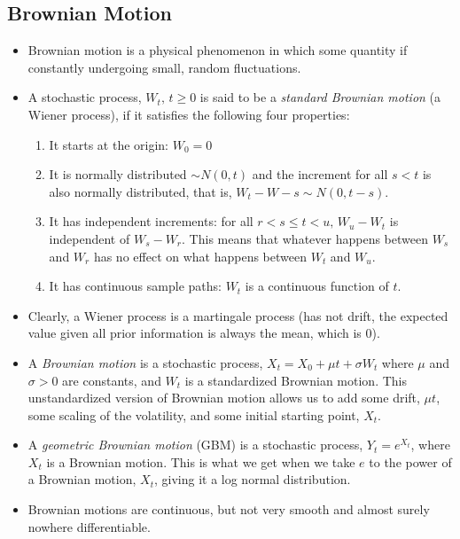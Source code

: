 \documentclass[11pt]{article}
\begin{document}
\subsection{Brownian Motion}
\begin{itemize}
    \item Brownian motion is a physical phenomenon in which some quantity if constantly 
    undergoing small, random fluctuations. 
    \item A stochastic process, $W_t, \, t \ge 0$ is said to be a \textit{standard Brownian 
    motion} (a Wiener process), if it satisfies the following four properties: 
    \begin{enumerate}
        \item It starts at the origin: $W_0 = 0$
        \item It is normally distributed  $\sim N(0,t)$ and the increment for all $s<t$ is 
        also normally distributed, that is, $W_t - W-s \sim N(0, t-s)$. 
        \item It has independent increments: for all $r<s \le t<u, \, W_u - W_t$ is 
        independent of $W_s - W_r$. This means that whatever happens between $W_s$ and $W_r$ 
        has no effect on what happens between $W_t$ and $W_u$.
        \item It has continuous sample paths: $W_t$ is a continuous function of $t$.
    \end{enumerate}
    \item Clearly, a Wiener process is a martingale process (has not drift, the expected 
    value given all prior information is always the mean, which is 0). 
    \item A \textit{Brownian motion} is a stochastic process, $X_t = X_0 + \mu t + \sigma W_t$
    where $\mu$ and $\sigma > 0$ are constants, and $W_t$ is a standardized Brownian motion. 
    This unstandardized version of Brownian motion allows us to add some drift, $\mu t$, some 
    scaling of the volatility, and some initial starting point, $X_t$.
    \item A \textit{geometric Brownian motion} (GBM) is a stochastic process, $Y_t = e^{X_t}$, 
    where $X_t$ is a Brownian motion. This is what we get when we take $e$ to the power of a 
    Brownian motion, $X_t$, giving it a log normal distribution.
    \item Brownian motions are continuous, but not very smooth and almost surely nowhere 
    differentiable. 
\end{itemize}
\end{document}
